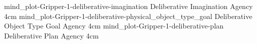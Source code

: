 {{                           \experimentcausegroupplotscontinued{\dataappendixexperimentthreeprettyname}
                                                              {mind_plot-Gripper-1-deliberative-imagination}
                                                              {Deliberative Imagination Agency}
                                                              {\experimentdatacommontablereference}
                                                              {4cm}}
{\experimentcausegroupplots{\dataappendixmaxtime}
                           {\dataappendixexperimentonemaxtime}
                           {\dataappendixexperimenttwomaxtime}
                           {\dataappendixexperimentthreemaxtime}
                           {\dataappendixexperimentonename}
                           {\dataappendixexperimenttwoname}
                           {\dataappendixexperimentthreename}
                           {\dataappendixexperimentoneprettyname}
                           {\dataappendixexperimenttwoprettyname}
                           \experimentcausegroupplotscontinued{\dataappendixexperimentthreeprettyname}
                                                              {mind_plot-Gripper-1-deliberative-physical_object_type_goal}
                                                              {Deliberative Object Type Goal Agency}
                                                              {\experimentdatacommontablereference}
                                                              {4cm}}
{\experimentcausegroupplots{\dataappendixmaxtime}
                           {\dataappendixexperimentonemaxtime}
                           {\dataappendixexperimenttwomaxtime}
                           {\dataappendixexperimentthreemaxtime}
                           {\dataappendixexperimentonename}
                           {\dataappendixexperimenttwoname}
                           {\dataappendixexperimentthreename}
                           {\dataappendixexperimentoneprettyname}
                           {\dataappendixexperimenttwoprettyname}
                           \experimentcausegroupplotscontinued{\dataappendixexperimentthreeprettyname}
                                                              {mind_plot-Gripper-1-deliberative-plan}
                                                              {Deliberative Plan Agency}
                                                              {\experimentdatacommontablereference}
                                                              {4cm}}
}
